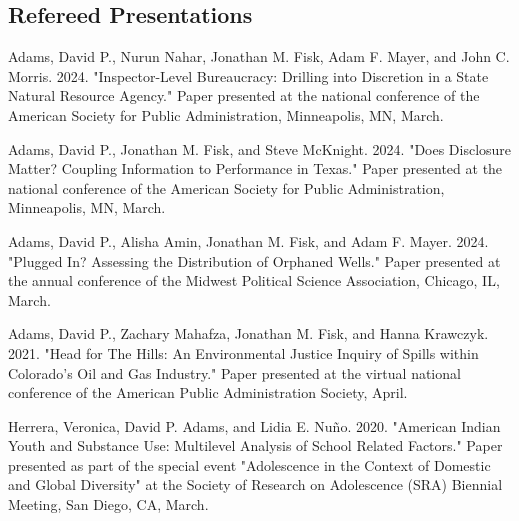 \documentclass[12pt,letterpaper]{article}
\renewenvironment{itemize}{
  \begin{list}{}{
    \setlength{\leftmargin}{1.5em}
    \setlength{\itemsep}{0.25em}
    \setlength{\parskip}{0pt}
    \setlength{\parsep}{0.25em}
  }
}{
  \end{list}
}
\begin{document}

\subsection*{Refereed Presentations}
	\begin{itemize}\leftmargin=2pt\itemindent=-15pt\leftmargin=2pt\itemindent=-15pt

      \item Adams, David P., Nurun Nahar, Jonathan M. Fisk, Adam F. Mayer, and John C. Morris. 2024. "Inspector-Level Bureaucracy: Drilling into Discretion in a State Natural Resource Agency." Paper presented at the national conference of the American Society for Public Administration, Minneapolis, MN, March.
      
      \item Adams, David P., Jonathan M. Fisk, and Steve McKnight. 2024. "Does Disclosure Matter? Coupling Information to Performance in Texas." Paper presented at the national conference of the American Society for Public Administration, Minneapolis, MN, March.
      
      \item Adams, David P., Alisha Amin, Jonathan M. Fisk, and Adam F. Mayer. 2024. "Plugged In? Assessing the Distribution of Orphaned Wells." Paper presented at the annual conference of the Midwest Political Science Association, Chicago, IL, March.
      
      \item Adams, David P., Zachary Mahafza, Jonathan M. Fisk, and Hanna Krawczyk. 2021. "Head for The Hills: An Environmental Justice Inquiry of Spills within Colorado's Oil and Gas Industry." Paper presented at the virtual national conference of the American Public Administration Society, April.
      
      \item Herrera, Veronica, David P. Adams, and Lidia E. Nuño. 2020. "American Indian Youth and Substance Use: Multilevel Analysis of School Related Factors." Paper presented as part of the special event "Adolescence in the Context of Domestic and Global Diversity" at the Society of Research on Adolescence (SRA) Biennial Meeting, San Diego, CA, March.
      

\end{itemize}
\end{document}
